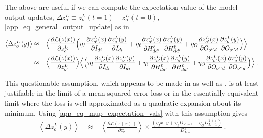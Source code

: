 \documentclass[11pt]{article}
\begin{document}
The above are useful if we can compute the expectation value of the model output updates, $
\Delta z^{ L }_{ o }\equiv z^{ L }_{ o }(t=1) -z^{ L }_{ o }(t=0) $,
\eqref{app_eq_general_output_update} as in
\begin{align}
    \left \langle \Delta z^{ L }_{ o }\left ( y \right ) \right \rangle &\approx
    - \Big \langle \frac{ \partial \mathcal{L}(z(x)) }{\partial z ^{ L }_{ o' }  }\Big( \eta_{ I } \frac{ \partial z ^{ L }_{ o' }(x) }{ \partial I_{ di } }\frac{ \partial z^{ L }_{ o }(y) }{ \partial I_{ di } }
    + \eta_{ \ell }\frac{ \partial z ^{ L }_{ o' }(x) }{ \partial H^{ \ell }_{ dd' } }\frac{ \partial z^{ L }_{ o }(y) }{ \partial H^{ \ell }_{ dd' } }
    + \eta_{ O }\frac{ \partial z ^{ L }_{ o' }(x) }{ \partial O_{ o''d } }\frac{ \partial z^{ L }_{ o }(y) }{ \partial O_{ o''d  } } \Big ) \Big \rangle\nonumber\\
    &\approx
    - \Big \langle \frac{ \partial \mathcal{L}(z(x)) }{\partial z ^{ L }_{ o' }  }\Big\rangle \Big\langle\Big( \eta_{ I } \frac{ \partial z ^{ L }_{ o' }(x) }{ \partial I_{ di } }\frac{ \partial z^{ L }_{ o }(y) }{ \partial I_{ di } }
    + \eta_{ \ell }\frac{ \partial z ^{ L }_{ o' }(x) }{ \partial H^{ \ell }_{ dd' } }\frac{ \partial z^{ L }_{ o }(y) }{ \partial H^{ \ell }_{ dd' } }
    + \eta_{ O }\frac{ \partial z ^{ L }_{ o' }(x) }{ \partial O_{ o''d } }\frac{ \partial z^{ L }_{ o }(y) }{ \partial O_{ o''d  } } \Big ) \Big \rangle \ .
\end{align}

This questionable assumption, which appears to be made in \cite{yang2022tensor} as well as
\cite{physicalDL}, is at least justifiable in the limit of a mean-squared-error loss or in the
essentially-equivalent limit where the loss is well-approximated as a quadratic expansion about its
minimum. Using \eqref{app_eq_mup_expectation_vals} with this assumption gives
\begin{align}
    \left \langle \Delta z^{ L }_{ o }\left ( y \right ) \right \rangle &\approx
    - \left \langle \frac{ \partial \mathcal{L}(z(x)) }{\partial z ^{ L }_{ o }  }\right\rangle \times  \frac{ \left ( \eta_{ I } x \cdot y
    + \eta_{ \ell }  D_{ \ell-1 }
+ \eta_{ O }D^{1+s}_{ L-1 } \right )}{D^{ s }_{ L-1 }} \ . \label{app_eq_deltaz_scaling}
\end{align}
\end{document}
